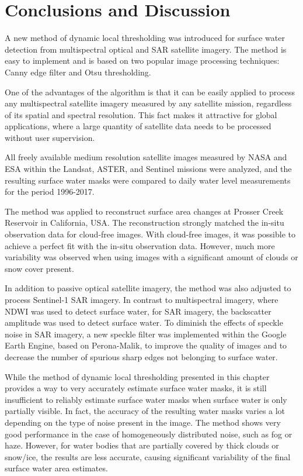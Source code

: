 \section{Conclusions and Discussion}

A new method of dynamic local thresholding was introduced for surface water detection from multispectral optical and \gls{SAR} satellite imagery. The method is easy to implement and is based on two popular image processing techniques: Canny edge filter and Otsu thresholding. 

One of the advantages of the algorithm is that it can be easily applied to process any multispectral satellite imagery measured by any satellite mission, regardless of its spatial and spectral resolution. This fact makes it attractive for global applications, where a large quantity of satellite data needs to be processed without user supervision. 

All freely available medium resolution satellite images measured by NASA and ESA within the Landsat, ASTER, and Sentinel missions were analyzed, and the resulting surface water masks were compared to daily water level measurements for the period 1996-2017.

The method was applied to reconstruct surface area changes at Prosser Creek Reservoir in California, USA. The reconstruction strongly matched the in-situ observation data for cloud-free images. With cloud-free images, it was possible to achieve a perfect fit with the in-situ observation data. However, much more variability was observed when using images with a significant amount of clouds or snow cover present. 

In addition to passive optical satellite imagery, the method was also adjusted to process Sentinel-1 \gls{SAR} imagery. In contrast to multispectral imagery, where \gls{NDWI} was used to detect surface water, for \gls{SAR} imagery, the backscatter amplitude was used to detect surface water. To diminish the effects of speckle noise in \gls{SAR} imagery, a new speckle filter was implemented within the Google Earth Engine, based on Perona-Malik, to improve the quality of images and to decrease the number of spurious sharp edges not belonging to surface water. 

While the method of dynamic local thresholding presented in this chapter provides a way to very accurately estimate surface water masks, it is still insufficient to reliably estimate surface water masks when surface water is only partially visible. In fact, the accuracy of the resulting water masks varies a lot depending on the type of noise present in the image. The method shows very good performance in the case of homogeneously distributed noise, such as fog or haze. However, for water bodies that are partially covered by thick clouds or snow/ice, the results are less accurate, causing significant variability of the final surface water area estimates.

